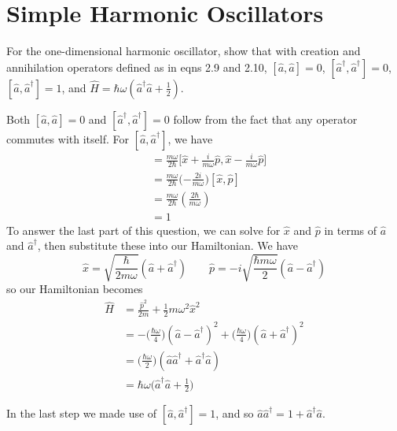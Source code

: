 \documentclass[../qft-for-the-gifted-amateur.tex]{subfiles}
\begin{document}
\section{Simple Harmonic Oscillators}

\begin{questions}
	\printanswers

	\question For the one-dimensional harmonic oscillator, show that with creation and annihilation operators defined as in eqns 2.9 and 2.10, $[\hat{a},\hat{a}] = 0$, $[\hat{a}^\dagger, \hat{a}^\dagger] = 0$, $[\hat{a},\hat{a}^\dagger]=1$, and $\hat{H}=\hbar\omega(\hat{a}^\dagger\hat{a} + \frac{1}{2})$.
	
	\begin{solution}
		Both $[\hat{a},\hat{a}]=0$ and $[\hat{a}^\dagger, \hat{a}^\dagger]=0$
		follow from the fact that any operator commutes with itself. For
		$[\hat{a}, \hat{a}^\dagger]$, we have
		\begin{align*}
		[\hat{a}, \hat{a}^\dagger] &= \frac{m\omega}{2\hbar}\Big[\hat{x} + \frac{i}{m\omega}\hat{p}, \hat{x} - \frac{i}{m\omega}\hat{p}\Big] \\
		&= \frac{m\omega}{2\hbar}\Big({- \frac{2i}{m\omega}}\Big)[\hat{x},\hat{p}] \\
		&= \frac{m\omega}{2\hbar}(\frac{2\hbar}{m\omega}) \\
		&= 1
		\end{align*}
		To answer the last part of this question, we can solve for
		$\hat{x}$ and $\hat{p}$ in terms of $\hat{a}$ and
		${\hat{a}}^{\dagger}$, then substitute these into our Hamiltonian.
		We have
		\[
			\hat{x} = \sqrt{\frac{\hbar}{2m\omega}}(\hat{a} + {\hat{a}}^{\dagger}) \qquad \hat{p} = -i\sqrt{\frac{\hbar m\omega}{2}}(\hat{a} - {\hat{a}}^{\dagger})
		\]
		so our Hamiltonian becomes
		\begin{align*}
		\hat{H} &= \frac{{\hat{p}}^{2}}{2m} + \frac{1}{2}m\omega^{2}{\hat{x}}^{2} \\
		&= - \Big(\frac{\hbar\omega}{4}\Big)(\hat{a} - {\hat{a}}^{\dagger})^{2} + \Big(\frac{\hbar\omega}{4}\Big)(\hat{a} + {\hat{a}}^{\dagger})^{2} \\
		&= \Big(\frac{\hbar\omega}{2}\Big)(\hat{a}{\hat{a}}^{\dagger} + {\hat{a}}^{\dagger}\hat{a}) \\
		&= \hbar\omega\Big({\hat{a}}^{\dagger}\hat{a} + \frac{1}{2}\Big)
		\end{align*}
		
		In the last step we made use of
		$[\hat{a},{\hat{a}}^{\dagger}] = 1$, and so
		$\hat{a}{\hat{a}}^{\dagger} = 1 + {\hat{a}}^{\dagger}\hat{a}$.
	\end{solution}
	

\end{questions}
\end{document}
